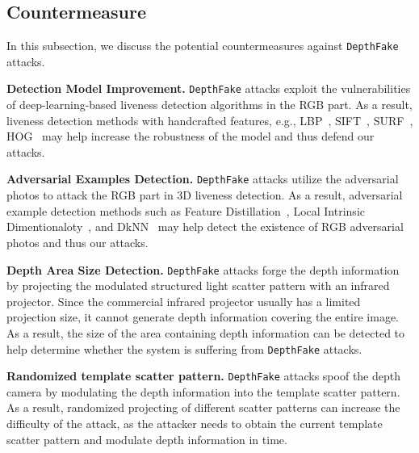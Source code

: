 


\subsection{Countermeasure}
In this subsection, we discuss the potential countermeasures against \texttt{DepthFake} attacks.

\textbf{Detection Model Improvement. } \texttt{DepthFake} attacks exploit the vulnerabilities of deep-learning-based liveness detection algorithms in the RGB part. 
As a result, liveness detection methods with handcrafted features, e.g., LBP~\cite{de2012lbp, boulkenafet2015face}, SIFT~\cite{patel2016secure}, SURF~\cite{boulkenafet2016face}, HOG~\cite{komulainen2013context} may help increase the robustness of the model and thus defend our attacks. 

\textbf{Adversarial Examples Detection.} \texttt{DepthFake} attacks utilize the adversarial photos to attack the RGB part in  3D liveness detection. 
As a result, adversarial example detection methods such as Feature Distillation~\cite{liu2019feature}, Local Intrinsic Dimentionaloty~\cite{ma2018characterizing}, and DkNN~\cite{papernot2018deep}  may help detect the existence of  RGB adversarial photos and thus our attacks.

\textbf{Depth Area Size Detection. }  \texttt{DepthFake} attacks forge the depth information by projecting the modulated structured light scatter pattern with an infrared projector. Since the commercial infrared projector usually has a limited projection size, it cannot generate depth information covering the entire image. As a result,  the size of the area containing depth information can be detected to help determine whether the system is suffering from \texttt{DepthFake} attacks.

\textbf{Randomized template scatter pattern.}  \texttt{DepthFake} attacks spoof the depth camera by modulating the depth information into the template scatter pattern. As a result, randomized projecting of different scatter patterns can increase the difficulty of the attack, as the attacker needs to obtain the current template scatter pattern and modulate depth information in time.

